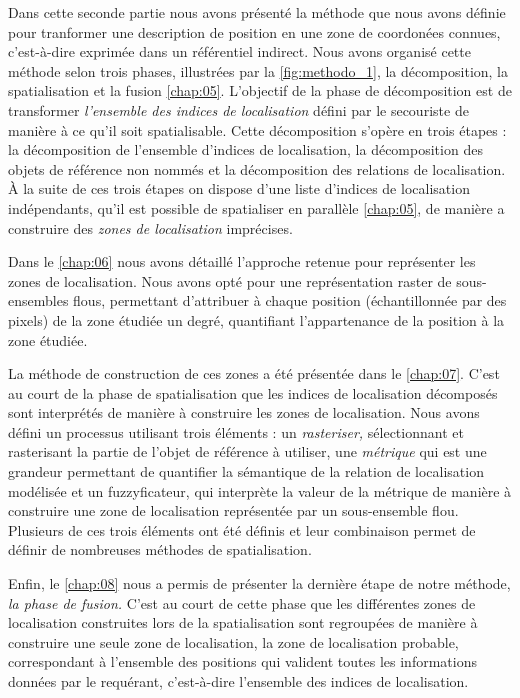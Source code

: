 Dans cette seconde partie nous avons présenté la méthode que nous
avons définie pour tranformer une description de position en une zone
de coordonées connues, c'est-à-dire exprimée dans un référentiel
indirect. Nous avons organisé cette méthode selon trois phases,
illustrées par la \autoref{fig:methodo_1}, la décomposition, la
spatialisation et la fusion \autoref{chap:05}. L'objectif de la phase
de décomposition est de transformer \emph{l'ensemble des indices de
  localisation} défini par le secouriste de manière à ce qu'il soit
spatialisable. Cette décomposition s'opère en trois étapes : la
décomposition de l'ensemble d'indices de localisation, la
décomposition des objets de référence non nommés et la décomposition
des relations de localisation. À la suite de ces trois étapes on
dispose d'une liste d'indices de localisation indépendants, qu'il est
possible de spatialiser en parallèle \autoref{chap:05}, de manière a
construire des \emph{zones de localisation} imprécises.

Dans le \autoref{chap:06} nous avons détaillé l'approche retenue pour
représenter les zones de localisation. Nous avons opté pour une
représentation raster de sous-ensembles flous, permettant d'attribuer
à chaque position (échantillonnée par des pixels) de la zone étudiée
un degré, quantifiant l'appartenance de la position à la zone
étudiée.

La méthode de construction de ces zones a été présentée dans le
\autoref{chap:07}. C'est au court de la phase de spatialisation que
les indices de localisation décomposés sont interprétés de manière à
construire les zones de localisation. Nous avons défini un processus
utilisant trois éléments : un \emph{rasteriser,} sélectionnant et
rasterisant la partie de l'objet de référence à utiliser, une
\emph{métrique} qui est une grandeur permettant de quantifier la
sémantique de la relation de localisation modélisée et un
fuzzyficateur, qui interprète la valeur de la métrique de manière à
construire une zone de localisation représentée par un sous-ensemble
flou. Plusieurs de ces trois éléments ont été définis et leur
combinaison permet de définir de nombreuses méthodes de
spatialisation.

Enfin, le \autoref{chap:08} nous a permis de présenter la dernière
étape de notre méthode, \emph{la phase de fusion.} C'est au court de
cette phase que les différentes zones de localisation construites lors
de la spatialisation sont regroupées de manière à construire une seule
zone de localisation, la zone de localisation probable, correspondant
à l'ensemble des positions qui valident toutes les informations
données par le requérant, c'est-à-dire l'ensemble des indices de
localisation.
